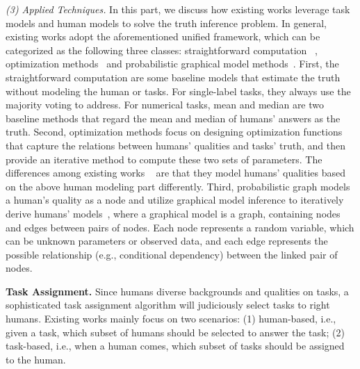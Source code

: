 \textit{(3) Applied Techniques.} In this part, we discuss how existing works leverage task models and human models to solve the truth inference problem. In general, existing works adopt the aforementioned unified framework, which can be categorized as the following three classes:  straightforward computation ~\cite{DBLP:conf/sigmod/FranklinKKRX11, DBLP:conf/cikm/ParameswaranPGPW12}, optimization methods~\cite{DBLP:conf/aaai/AydinYLLGD14, DBLP:journals/pvldb/LiLGSZDFH14, DBLP:conf/sigmod/LiLGZFH14, DBLP:conf/nips/ZhouPBM12} and probabilistic graphical model methods~\cite{DBLP:conf/nips/KargerOS11, DBLP:conf/nips/LiuPI12}. First,  the straightforward computation are some baseline models that estimate the truth without modeling the human or tasks. For single-label tasks, they always use the majority voting to address. For numerical tasks,  mean and median are two baseline methods that regard the mean and median of humans’ answers as the truth.  
Second, optimization methods focus on designing optimization functions that capture the relations between humans’ qualities and tasks’ truth, and then provide an iterative method to compute these two sets of parameters. The differences among existing works ~\cite{DBLP:conf/aaai/AydinYLLGD14, DBLP:journals/pvldb/LiLGSZDFH14, DBLP:conf/sigmod/LiLGZFH14, DBLP:conf/nips/ZhouPBM12} are that they model humans’ qualities based on the above human modeling part differently. 
Third,  probabilistic graph models a human’s quality as a node and utilize graphical model inference  to iteratively derive humans’ models~\cite{DBLP:conf/nips/KargerOS11, DBLP:conf/nips/LiuPI12}, where a graphical model is a graph, containing nodes and edges between pairs of nodes. Each node represents a random variable, which can be unknown parameters or observed data, and each edge represents the possible relationship (e.g., conditional dependency) between the linked pair of nodes. 


\textbf{Task Assignment.} \label{subsec:task_assignment}
 Since humans  diverse backgrounds and  qualities on tasks, a sophisticated task assignment algorithm will judiciously select  tasks to right humans. Existing works mainly focus on two  scenarios: (1) human-based, i.e., given a task, which subset of humans should be selected to answer the task; (2) task-based, i.e., when a human comes, which subset of tasks should be assigned to the human.
 
